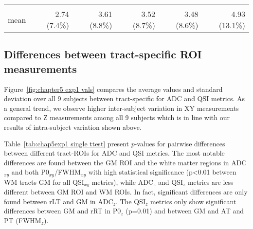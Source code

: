 \begin{table}[p]
\begin{tableframe}
\begin{adjustbox}{width={0.75\textwidth},keepaspectratio}
\begin{minipage}{\linewidth}
{\begin{minipage}{\linewidth}
\begin{tabular}{rrrrrr}
		                  &       &       &       &       &  \\
		            mean  & 2.74 (7.4\%) & 3.61 (8.8\%) & 3.52 (8.7\%) & 3.48 (8.6\%) & 4.93 (13.1\%) \\
		            \bottomrule
		        \end{tabular}%
				\label{tab:chap5exp1 scan rescan qsi}
	    		\end{minipage}
		    }
\end{minipage}
\end{adjustbox}
\end{tableframe}
\end{table}

\subsection{Differences between tract-specific ROI measurements}
Figure~\ref{fig:chapter5 exp1 vals} compares the average values and standard deviation over all 9 subjects between tract-specific for \gls{ADC} and \gls{QSI} metrics. As a general trend, we observe higher inter-subject variation in XY measurements compared to Z measurements among all 9 subjects which is in line with our results of intra-subject variation shown above.


Table~\ref{tab:chap5exp1 single ttest} present $p$-values for pairwise differences between different tract-\glspl{ROI} for ADC and \gls{QSI} metrics. The most notable differences are found between the GM \gls{ROI} and the white matter regions in ADC$_{xy}$ and both P0$_{xy}$/FWHM$_{xy}$ with high statistical significance (p<0.01 between WM tracts GM for all \gls{QSI}$_{xy}$ metrics), while ADC$_z$ and \gls{QSI}$_{z}$ metrics are less different between GM \gls{ROI} and WM \glspl{ROI}. In fact, significant differences are only found between rLT and GM in ADC$_z$. The \gls{QSI}$_z$ metrics only show significant differences between GM and rRT in P0$_z$ (p=0.01) and between GM and AT and PT (FWHM$_z$).



